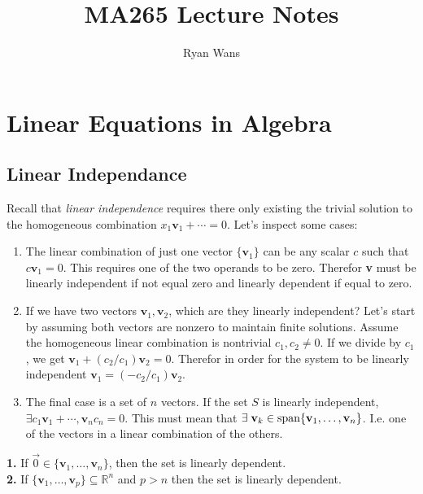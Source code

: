 \documentclass{article}
\title{MA265 Lecture Notes}
\author{Ryan Wans}
\numberwithin{equation}{section}
\newenvironment{statement}[1]{\smallskip\noindent\color[rgb]{1.00,0.00,0.50} {\bf #1.}}{}
\theoremstyle{definition}
\newcommand{\R}{\mathbb{R}}
\let\oldexists\exists
\renewcommand{\exists}{\mathrel{\oldexists}}
\theoremstyle{adefn}
\begin{document}
	\maketitle 
	\tableofcontents
	\pagebreak
	
	\section{Linear Equations in Algebra}
	
	\subsection{Linear Independance}
	Recall that \emph{linear independence} requires there only existing the trivial solution to the homogeneous combination $x_1\mathbf{v}_1 + \cdots = 0$.
	Let's inspect some cases:
	\begin{enumerate}
		\item The linear combination of just one vector $\{\mathbf{v}_1\}$ can be any scalar $c$ such that $c\mathbf{v}_1 = 0$. This requires one of the two operands to be zero. Therefor \textbf{v} must be linearly independent if not equal zero and linearly dependent if equal to zero. 
		\item If we have two vectors $\mathbf{v}_1, \mathbf{v}_2$, which are they linearly independent? Let's start by assuming both vectors are nonzero to maintain finite solutions. Assume the homogeneous linear combination is nontrivial $c_1, c_2 \neq 0$. If we divide by $c_1$, we get $\mathbf{v}_1 + (c_2 / c_1) \mathbf{v}_2 = 0$. Therefor in order for the system to be linearly independent $\mathbf{v}_1 = (-c_2 / c_1)\mathbf{v}_2$. 
		\item The final case is a set of $n$ vectors. If the set $S$ is linearly independent, $\exists c_1\mathbf{v}_1 +  \cdots, \mathbf{v}_n c_n = 0$. This must mean that $\exists \mathbf{v}_k \in \hbox{span}\{\mathbf{v}_1 , \ldots, \mathbf{v}_n\}$. I.e. one of the vectors in a linear combination of the others. 
	\end{enumerate}
	\begin{framed}
		\begin{statement}{1}
			If $\vec{0} \in \{\mathbf{v}_1, \ldots, \mathbf{v}_n\}$, then the set is linearly dependent. 
		\end{statement}\\
		\begin{statement}{2}
			If $\{\mathbf{v}_1, \ldots, \mathbf{v}_p\} \subseteq \R^n$ and $p > n$ then the set is linearly dependent. 
		\end{statement}
	\end{framed}
	
\end{document}
